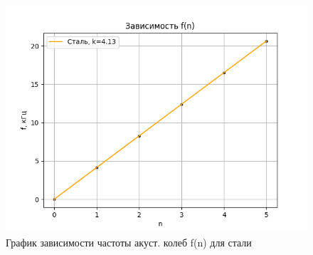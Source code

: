 \documentclass[a4paper, 10pt, twocolumn]{article}
\begin{document}
\begin{enumerate}
    \begin{figure}[H]
        \centering
        \includegraphics[width=1\linewidth]{graphs/figure3.png}
        \begin{center}
            \caption{График зависимости частоты акуст. колеб f(n) для стали}
        \end{center}
    \end{figure}


\end{enumerate}
\end{document}

